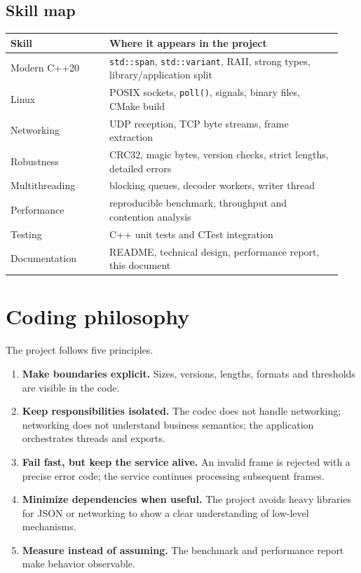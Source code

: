 \documentclass[10pt,a4paper]{article}
\begin{document}
\subsection{Skill map}
\begin{longtable}{@{}p{0.28\linewidth}p{0.66\linewidth}@{}}
\toprule
Skill & Where it appears in the project \\
\midrule
Modern C++20 & \texttt{std::span}, \texttt{std::variant}, RAII, strong types, library/application split \\
Linux & POSIX sockets, \texttt{poll()}, signals, binary files, CMake build \\
Networking & UDP reception, TCP byte streams, frame extraction \\
Robustness & CRC32, magic bytes, version checks, strict lengths, detailed errors \\
Multithreading & blocking queues, decoder workers, writer thread \\
Performance & reproducible benchmark, throughput and contention analysis \\
Testing & C++ unit tests and CTest integration \\
Documentation & README, technical design, performance report, this document \\
\bottomrule
\end{longtable}

\section{Coding philosophy}

The project follows five principles.

\begin{enumerate}
  \item \textbf{Make boundaries explicit.} Sizes, versions, lengths, formats and thresholds are visible in the code.
  \item \textbf{Keep responsibilities isolated.} The codec does not handle networking; networking does not understand business semantics; the application orchestrates threads and exports.
  \item \textbf{Fail fast, but keep the service alive.} An invalid frame is rejected with a precise error code; the service continues processing subsequent frames.
  \item \textbf{Minimize dependencies when useful.} The project avoids heavy libraries for JSON or networking to show a clear understanding of low-level mechanisms.
  \item \textbf{Measure instead of assuming.} The benchmark and performance report make behavior observable.
\end{enumerate}
\end{document}
